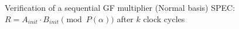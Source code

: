 \documentclass[xcolor=dvipsnames]{beamer}
\begin{document}
\begin{frame}{\large{Verification of a sequential GF multiplier (Normal basis)}}
SPEC: $R = A_{init}\cdot B_{init} \pmod {P(\alpha)}$ after $k$ clock cycles
\hspace{-0.3in}\begin{figure}[hbt]
\end{figure}
\end{frame}


\end{document}
